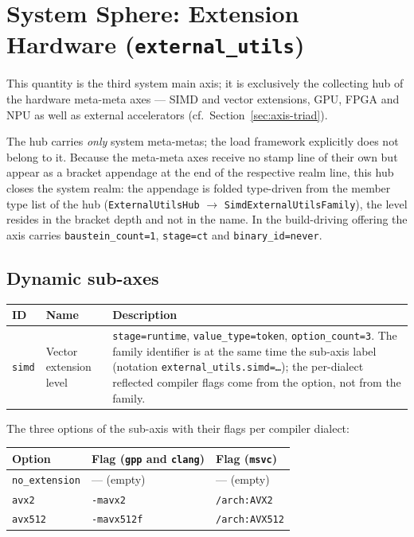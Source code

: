 \section{System Sphere: Extension Hardware (\texttt{external\_utils})}

This quantity is the third system main axis; it is exclusively the collecting hub of the hardware meta-meta axes --- SIMD and vector extensions, GPU, FPGA and NPU as well as external accelerators (cf.\ Section~\ref{sec:axis-triad}).

The hub carries \emph{only} system meta-metas; the load framework explicitly does not belong to it. Because the meta-meta axes receive no stamp line of their own but appear as a bracket appendage at the end of the respective realm line, this hub closes the system realm: the appendage is folded type-driven from the member type list of the hub (\texttt{External\allowbreak{}Utils\allowbreak{}Hub} $\rightarrow$ \texttt{Simd\allowbreak{}External\allowbreak{}Utils\allowbreak{}Family}), the level resides in the bracket depth and not in the name. In the build-driving offering the axis carries \texttt{baustein\_\allowbreak{}count=1}, \texttt{stage=ct} and \texttt{binary\_\allowbreak{}id=never}.

\subsection*{Dynamic sub-axes}

\begin{scriptsize}
\begin{longtable}{@{}>{\raggedright\arraybackslash}p{1.8cm} >{\raggedright\arraybackslash}p{3.2cm} >{\raggedright\arraybackslash}p{8.5cm}@{}}
\toprule
ID & Name & Description \\
\midrule
\endhead%
\texttt{simd} & Vector extension level & \texttt{stage=runtime}, \texttt{value\_\allowbreak{}type=token}, \texttt{option\_\allowbreak{}count=3}. The family identifier is at the same time the sub-axis label (notation \texttt{external\_\allowbreak{}utils.simd=\dots}); the per-dialect reflected compiler flags come from the option, not from the family. \\
\bottomrule
\end{longtable}
\end{scriptsize}

The three options of the sub-axis with their flags per compiler dialect:

\begin{scriptsize}
\begin{longtable}{@{}>{\raggedright\arraybackslash}p{3.0cm} >{\raggedright\arraybackslash}p{5.2cm} >{\raggedright\arraybackslash}p{5.3cm}@{}}
\toprule
Option & Flag (\texttt{gpp} and \texttt{clang}) & Flag (\texttt{msvc}) \\
\midrule
\endhead%
\texttt{no\_\allowbreak{}extension} & --- (empty) & --- (empty) \\
\texttt{avx2} & \texttt{-mavx2} & \texttt{/arch:AVX2} \\
\texttt{avx512} & \texttt{-mavx512f} & \texttt{/arch:AVX512} \\
\bottomrule
\end{longtable}
\end{scriptsize}

